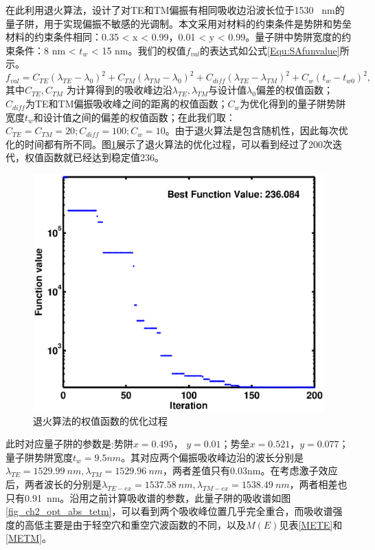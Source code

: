 在此利用退火算法，设计了对TE和TM偏振有相同吸收边沿波长位于1530~ nm的量子阱，用于实现偏振不敏感的光调制。本文采用对材料的约束条件是势阱和势垒材料的约束条件相同：0.35 < x < 0.99，0.01 < y < 0.99。量子阱中势阱宽度的约束条件：8 nm < $t_w$ < 15 nm。我们的权值$f_{val}$的表达式如公式\ref{Equ:SAfunvalue}所示。
\begin{equation}
\label{Equ:SAfunvalue}
f_{val} = C_{TE}(\lambda_{TE}-\lambda_{0})^2 + C_{TM}(\lambda_{TM}-\lambda_{0})^2 + C_{diff}(\lambda_{TE}-\lambda_{TM})^2 + C_{w}(t_w-t_{w0})^2,
\end{equation}
其中$C_{TE}, C_{TM}$ 为计算得到的吸收峰边沿$\lambda_{TE}, \lambda_{TM}$与设计值$\lambda_{0}$偏差的权值函数； $C_{diff}$为TE和TM偏振吸收峰之间的距离的权值函数；$C_{w}$为优化得到的量子阱势阱宽度$t_w$和设计值之间的偏差的权值函数；在此我们取：$C_{TE} = C_{TM} = 20; C_{diff} = 100; C_{w} = 10$。由于退火算法是包含随机性，因此每次优化的时间都有所不同。图\ref{fig_ch2_fast_annealing}展示了退火算法的优化过程，可以看到经过了200次迭代，权值函数就已经达到稳定值236。
\begin{figure}[htb]
	\centering
	\includegraphics[width=12cm]{./Pictures/fig_ch2_fast_annealing.eps}
	\caption{退火算法的权值函数的优化过程}
	\label{fig_ch2_fast_annealing}
\end{figure}
此时对应量子阱的参数是:势阱$x = 0.495$， $y  = 0.01$；势垒$x = 0.521$，$y = 0.077$；量子阱势阱宽度$t_w = 9.5 nm$。其对应两个偏振吸收峰边沿的波长分别是$ \lambda_{TE} =1529.99~ nm, \lambda_{TM} =  1529.96 ~nm$，两者差值只有0.03nm。在考虑激子效应后，两者波长的分别是$ \lambda_{TE-ex} =1537.58~ nm, \lambda_{TM-ex} =  1538.49~ nm$，两者相差也只有0.91~nm。沿用之前计算吸收谱的参数，此量子阱的吸收谱如图\ref{fig_ch2_opt_abs_tetm}，可以看到两个吸收峰位置几乎完全重合，而吸收谱强度的高低主要是由于轻空穴和重空穴波函数的不同，以及$M(E)$见表\ref{METE}和\ref{METM}。
